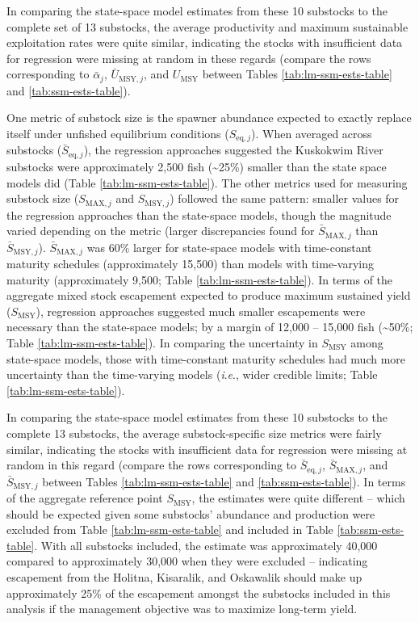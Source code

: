 \documentclass[12pt,]{book}
\theoremstyle{definition}
\theoremstyle{definition}
\theoremstyle{definition}
\theoremstyle{remark}
\begin{document}
In comparing the state-space model estimates from these 10 substocks to
the complete set of 13 substocks, the average productivity and maximum
sustainable exploitation rates were quite similar, indicating the stocks
with insufficient data for regression were missing at random in these
regards (compare the rows corresponding to \(\bar{\alpha}_j\),
\(\bar{U}_{\text{MSY},j}\), and \(U_{\text{MSY}}\) between Tables
\ref{tab:lm-ssm-ests-table} and \ref{tab:ssm-ests-table}).

One metric of substock size is the spawner abundance expected to exactly
replace itself under unfished equilibrium conditions
(\(S_{\text{eq},j}\)). When averaged across substocks
(\(\bar{S}_{\text{eq},j}\)), the regression approaches suggested the
Kuskokwim River substocks were approximately 2,500 fish
(\textasciitilde{}25\%) smaller than the state space models did (Table
\ref{tab:lm-ssm-ests-table}). The other metrics used for measuring
substock size (\(S_{\text{MAX},j}\) and \(S_{\text{MSY},j}\)) followed
the same pattern: smaller values for the regression approaches than the
state-space models, though the magnitude varied depending on the metric
(larger discrepancies found for \(\bar{S}_{\text{MAX},j}\) than
\(\bar{S}_{\text{MSY},j}\)). \(\bar{S}_{\text{MAX},j}\) was 60\% larger
for state-space models with time-constant maturity schedules
(approximately 15,500) than models with time-varying maturity
(approximately 9,500; Table \ref{tab:lm-ssm-ests-table}). In terms of
the aggregate mixed stock escapement expected to produce maximum
sustained yield (\(S_{\text{MSY}}\)), regression approaches suggested
much smaller escapements were necessary than the state-space models; by
a margin of 12,000 -- 15,000 fish (\textasciitilde{}50\%; Table
\ref{tab:lm-ssm-ests-table}). In comparing the uncertainty in
\(S_{\text{MSY}}\) among state-space models, those with time-constant
maturity schedules had much more uncertainty than the time-varying
models (\emph{i}.\emph{e}., wider credible limits; Table
\ref{tab:lm-ssm-ests-table}).

In comparing the state-space model estimates from these 10 substocks to
the complete 13 substocks, the average substock-specific size metrics
were fairly similar, indicating the stocks with insufficient data for
regression were missing at random in this regard (compare the rows
corresponding to \(\bar{S}_{\text{eq},j}\), \(\bar{S}_{\text{MAX},j}\),
and \(\bar{S}_{\text{MSY},j}\) between Tables
\ref{tab:lm-ssm-ests-table} and \ref{tab:ssm-ests-table}). In terms of
the aggregate reference point \(S_{\text{MSY}}\), the estimates were
quite different -- which should be expected given some substocks'
abundance and production were excluded from Table
\ref{tab:lm-ssm-ests-table} and included in Table
\ref{tab:ssm-ests-table}. With all substocks included, the estimate was
approximately 40,000 compared to approximately 30,000 when they were
excluded -- indicating escapement from the Holitna, Kisaralik, and
Oskawalik should make up approximately 25\% of the escapement amongst
the substocks included in this analysis if the management objective was
to maximize long-term yield.
\end{document}

